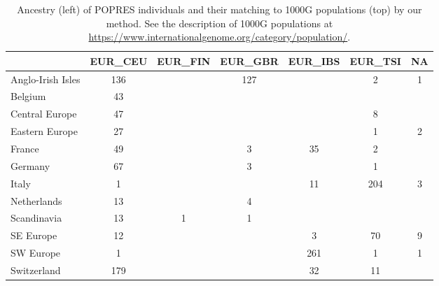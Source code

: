 \begin{table}[ht]
\centering
\caption{Ancestry (left) of POPRES individuals and their matching to 1000G populations (top) by our method. See the description of 1000G populations at \url{https://www.internationalgenome.org/category/population/}.}
\label{tab:ancestry-pred-popres}
\begin{tabular}{|l|c|c|c|c|c|c|}
  \hline
 & EUR\_CEU & EUR\_FIN & EUR\_GBR & EUR\_IBS & EUR\_TSI & NA \\
  \hline
Anglo-Irish Isles & 136 &  & 127 &  & 2 & 1 \\
  Belgium & 43 &  &  &  &  &  \\
  Central Europe & 47 &  &  &  & 8 &  \\
  Eastern Europe & 27 &  &  &  & 1 & 2 \\
  France & 49 &  & 3 & 35 & 2 &  \\
  Germany & 67 &  & 3 &  & 1 &  \\
  Italy & 1 &  &  & 11 & 204 & 3 \\
  Netherlands & 13 &  & 4 &  &  &  \\
  Scandinavia & 13 & 1 & 1 &  &  &  \\
  SE Europe & 12 &  &  & 3 & 70 & 9 \\
  SW Europe & 1 &  &  & 261 & 1 & 1 \\
  Switzerland & 179 &  &  & 32 & 11 &  \\
   \hline
\end{tabular}
\end{table}

